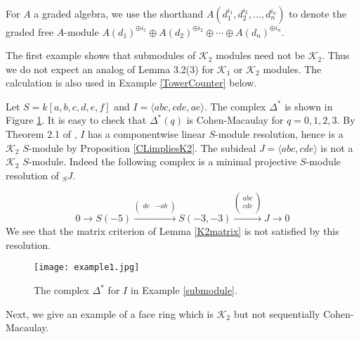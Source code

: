 \documentclass[11pt,righttag]{amsart}
\begin{document}
For $A$ a graded algebra, we use the shorthand $A(d_1^{i_1}, d_2^{i_2}, \ldots, d_n^{i_n})$ to denote the graded free $A$-module $A(d_1)^{\oplus i_1}\oplus A(d_2)^{\oplus i_2}\oplus \cdots \oplus A(d_n)^{\oplus i_n}$. 

The first example shows that submodules of ${{\mathcal K}}_2$ modules need not be ${{\mathcal K}}_2$. Thus we do not expect an analog of Lemma 3.2(3) for ${{\mathcal K}}_1$ or ${{\mathcal K}}_2$ modules. The calculation is also used in Example \ref{TowerCounter} below.

\begin{example}
\label{submodule}
Let $S=k[a,b,c,d,e,f]$ and  $I={\langle} abc, cde, ae{\rangle}$. The complex ${\Delta}^*$ is shown in Figure \ref{submodulefig}. It is easy to check that ${\Delta}^*(q)$ is Cohen-Macaulay for $q=0,1,2,3$. By  Theorem 2.1 of \cite{HH}, $I$  has a componentwise linear $S$-module resolution, hence is a ${{\mathcal K}}_2$ $S$-module by Proposition \ref{CLimpliesK2}. The subideal $J={\langle} abc, cde{\rangle}$ is not a ${{\mathcal K}}_2$ $S$-module. Indeed the following complex is a minimal projective $S$-module resolution of $_SJ$.

$$0\rightarrow S(-5)\xrightarrow{\begin{pmatrix} de & -ab\\ \end{pmatrix}}S(-3,-3)\xrightarrow{\begin{pmatrix} abc\\ cde\\ \end{pmatrix}} J\rightarrow 0$$
We see that the matrix criterion of Lemma \ref{K2matrix} is not satisfied by this resolution.

\begin{figure}[ht] 
   \centering
   \texttt{[image: example1.jpg]} 
   \caption{The complex ${\Delta}^*$ for $I$ in Example \ref{submodule}.}
         \label{submodulefig}
\end{figure}
\end{example}

Next, we give an example  of a face ring which is ${{\mathcal K}}_2$ but not sequentially Cohen-Macaulay.
 
\end{document}
